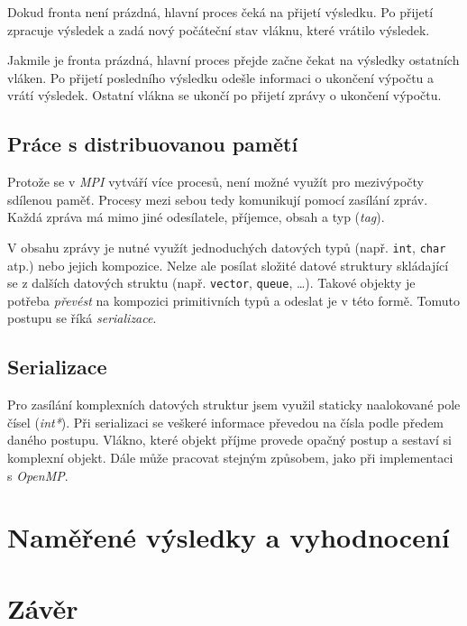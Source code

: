 \documentclass[czech]{article}
\begin{document}
Dokud fronta není prázdná, hlavní proces čeká na přijetí výsledku.
Po přijetí zpracuje výsledek a zadá nový počáteční stav vláknu, které vrátilo výsledek.

Jakmile je fronta prázdná, hlavní proces přejde začne čekat na výsledky ostatních vláken.
Po přijetí posledního výsledku odešle informaci o ukončení výpočtu a vrátí výsledek.
Ostatní vlákna se ukončí po přijetí zprávy o ukončení výpočtu.

\subsection{Práce s distribuovanou pamětí}

Protože se v \textit{MPI} vytváří více procesů, není možné využít pro mezivýpočty sdílenou paměť.
Procesy mezi sebou tedy komunikují pomocí zasílání zpráv.
Každá zpráva má mimo jiné odesílatele, příjemce, obsah a typ (\textit{tag}).

V obsahu zprávy je nutné využít jednoduchých datových typů (např. \texttt{int}, \texttt{char} atp.) nebo jejich kompozice.
Nelze ale posílat složité datové struktury skládající se z dalších datových struktu (např. \texttt{vector}, \texttt{queue}, \dots).
Takové objekty je potřeba \textit{převést} na kompozici primitivních typů a odeslat je v této formě.
Tomuto postupu se říká \textit{serializace}.

\subsection{Serializace}

Pro zasílání komplexních datových struktur jsem využil staticky naalokované pole čísel (\textit{int*}).
Při serializaci se veškeré informace převedou na čísla podle předem daného postupu.
Vlákno, které objekt příjme provede opačný postup a sestaví si komplexní objekt.
Dále může pracovat stejným způsobem, jako při implementaci s \textit{OpenMP}.

\section{Naměřené výsledky a vyhodnocení}

\section{Závěr}
\end{document}
